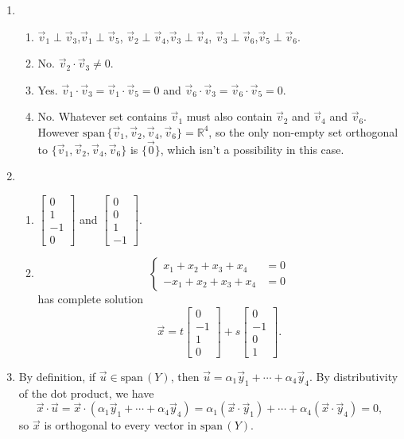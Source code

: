 \documentclass[red]{tutorial}
\newcommand{\R}{\mathbb{R}}
\newcommand{\Span}{\mathrm{span}\,}
\newcommand{\mat}[1]{\begin{bmatrix}#1\end{bmatrix}}
\theoremstyle{definition}
\theoremstyle{theorem}
\begin{document}
	\begin{solutions}

		\begin{enumerate}
			\item 
			\begin{enumerate}
				\item 
				$\vec v_1\perp \vec v_3$,\quad  $\vec v_1\perp \vec v_5$, \quad 
				$\vec v_2\perp\vec v_4$,\quad  $\vec v_3\perp \vec v_4$,\quad 
				$\vec v_3\perp \vec v_6$,\quad  $\vec v_5\perp \vec v_6$.

				\item No. $\vec v_2\cdot \vec v_3\neq 0$.
				\item Yes. $\vec v_1\cdot \vec v_3=\vec v_1\cdot \vec v_5=0$ and
					$\vec v_6\cdot \vec v_3=\vec v_6\cdot \vec v_5=0$.
				\item No. Whatever set contains $\vec v_1$ must also contain $\vec v_2$ and
					$\vec v_4$ and $\vec v_6$.
					However $\Span\{\vec v_1,\vec v_2,\vec v_4,
					\vec v_6\}=\R^4$, so the only non-empty set orthogonal
					to $\{\vec v_1,\vec v_2,\vec v_4,
					\vec v_6\}$ is $\{\vec 0\}$, which isn't a possibility in this case.
			\end{enumerate}
			\item \begin{enumerate}
					\item $\mat{0\\1\\-1\\0}$ and $\mat{0\\0\\1\\-1}$.
					\item \[
							\begin{cases}x_1+x_2+x_3+x_4&=0\\ -{x_1}+x_2+x_3+x_4&=0\end{cases}
						\]
					has complete solution
					\[
						\vec x = t\mat{0\\-1\\1\\0}+s\mat{0\\-1\\0\\1}.
					\]
			\end{enumerate}

			\item By definition, if $\vec u\in\Span(Y)$, then $\vec u=\alpha_1\vec y_1+\cdots+\alpha_4\vec y_4$.
				By distributivity of the dot product, we have
				\[
					\vec x\cdot \vec u = \vec x\cdot (\alpha_1\vec y_1+\cdots+\alpha_4\vec y_4)
					=\alpha_1(\vec x\cdot \vec y_1)+\cdots +\alpha_4(\vec x\cdot \vec y_4)=0,
				\]
				so $\vec x$ is orthogonal to every vector in $\Span(Y)$.


\end{enumerate}
\end{solutions}
\end{document}
